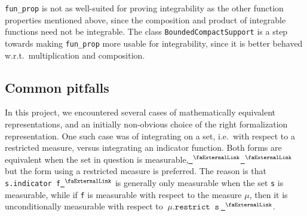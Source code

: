 \documentclass[12pt]{amsart}
\newcommand{\lean}[1]{\lstinline{#1}}
\newcommand{\mlean}[1]{\mathtt{\ #1\ }}
\newcommand{\extlink}{~\ensuremath{{}^\text{\faExternalLink}}}
\theoremstyle{definition}
\theoremstyle{plain}
\begin{document}
\lean{fun_prop} is not as well-suited for proving integrability
as the other function properties mentioned above,
since the composition and product of integrable functions need not be integrable.
The class \lean{BoundedCompactSupport} is a step towards
making \texttt{fun\_prop} more usable for integrability,
since it is better behaved w.r.t.\ multiplication and composition.

\subsection{Common pitfalls}\label{subsec:pitfalls}

In this project, we encountered several cases of mathematically equivalent representations, and an initially non-obvious choice of the right formalization representation. One such case was of integrating on a set, i.e.\ with respect to a restricted measure, versus integrating an indicator function.
Both forms are equivalent when the set in question is measurable,\href{https://github.com/leanprover-community/mathlib4/blob/81a5d257c8e410db227a6665ed08f64fea08e997/Mathlib/MeasureTheory/Integral/Lebesgue/Basic.lean#L495-L502}{\extlink}\href{https://github.com/leanprover-community/mathlib4/blob/44ea3a0e13339f31231dde209c4f8196e179065d/Mathlib/MeasureTheory/Integral/Bochner/Set.lean#L170-L183}{\extlink}
but the form using a restricted measure is preferred.
The reason is that \lean{s.indicator f}\href{https://github.com/leanprover-community/mathlib4/blob/44ea3a0e13339f31231dde209c4f8196e179065d/Mathlib/Algebra/Notation/Indicator.lean#L51-L51}{\extlink}
is generally only measurable when the set \lean{s} is measurable,
while if \lean{f} is measurable with respect to the measure $\mu$, then it is unconditionally
measurable with respect to $\mlean{\mu.restrict\;\; s}$\href{https://github.com/leanprover-community/mathlib4/blob/44ea3a0e13339f31231dde209c4f8196e179065d/Mathlib/MeasureTheory/Function/StronglyMeasurable/AEStronglyMeasurable.lean#L220-L223}{\extlink}.
\end{document}

